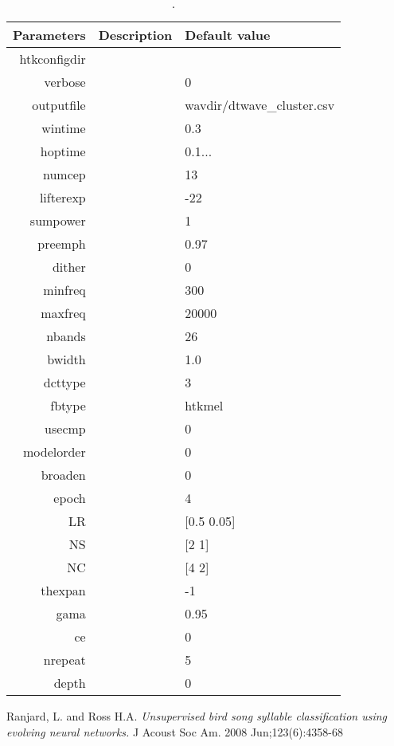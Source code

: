 \documentclass[a4paper]{article}
\begin{document}
\begin{table}[b]
\caption{.
}
\vspace{0.5cm}
\label{tab:dtwaveclusterparam}
\begin{center}
\begin{tabular}{r|c|l}
\hline
Parameters & Description & Default value\\
\hline
\hline
htkconfigdir   &   &  \\
verbose        &   & 0 \\
outputfile     &   & wavdir/dtwave\_cluster.csv \\
wintime        &   &  0.3 \\
hoptime        &   &  0.1... \\
numcep         &   & 13 \\
lifterexp      &   & -22 \\
sumpower       &   & 1 \\
preemph        &   &  0.97 \\
dither         &   & 0 \\
minfreq        &   & 300 \\
maxfreq        &   & 20000 \\
nbands         &   & 26 \\
bwidth         &   & 1.0 \\
dcttype        &   & 3 \\
fbtype         &   &  htkmel \\
usecmp         &   & 0 \\
modelorder     &   & 0 \\
broaden        &   & 0 \\
epoch          &   & 4 \\
LR             &   & [0.5 0.05] \\
NS             &   & [2 1] \\
NC             &   &  [4 2] \\
thexpan        &   &  -1 \\
gama           &   & 0.95 \\
ce             &   &  0 \\
nrepeat        &   &  5 \\
depth          &   &  0  \\
\hline
\end{tabular}
\end{center}
\end{table}


\clearpage
\begin{thebibliography}{9}
        Ranjard, L. and Ross H.A.
          \emph{Unsupervised bird song syllable classification using evolving neural networks.}
          J Acoust Soc Am. 2008 Jun;123(6):4358-68
\end{thebibliography}
\end{document}
